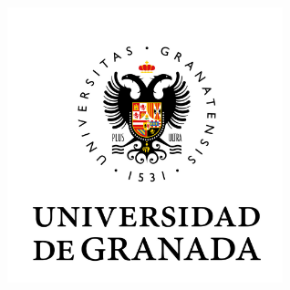 %


\begin{titlepage}
	\tgherosfont
	\centering

	\includegraphics[width=8cm]{img/ugrLogo.jpg} \\[2mm]

	\vfill
	{\large \thesisSubject} \\[5mm]
	{\LARGE \color{ctcolortitle}\textbf{\thesisTitle} \\[10mm]}
	{\LARGE \thesisName} \\

	\vfill
	

\end{titlepage}
